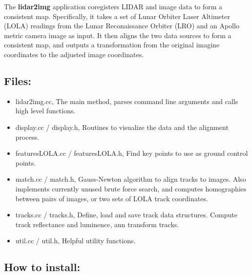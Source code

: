 The {\bf{lidar2img}} application coregisters LIDAR and image data to form a consistent map.
Specifically, it takes a set of Lunar Orbiter Laser Altimeter (LOLA) readings from
the Lunar Reconaissance Orbiter (LRO) and an Apollo metric camera image as input. It then
aligns the two data sources to form a consistent map, and outputs a transformation from
the original imagine coordinates to the adjusted image coordinates.

\subsection{Files:}

\begin{itemize}
	\item{lidar2img.cc, The main method, parses command line arguments and calls high level functions.}
	\item{display.cc / display.h, Routines to visualize the data and the alignment process.}
	\item{featuresLOLA.cc / featuresLOLA.h, Find key points to use as ground control points.}
	\item{match.cc / match.h, Gauss-Newton algorithm to align tracks to images. Also implements currently
		unused brute force search, and computes homographies between pairs of images, or two sets of LOLA
		track coordinates.}
	\item{tracks.cc / tracks.h, Define, load and save track data structures. Compute track reflectance and
		luminence, ann transform tracks.}
	\item{util.cc / util.h, Helpful utility functions.}
\end{itemize}

\subsection{How to install:}

